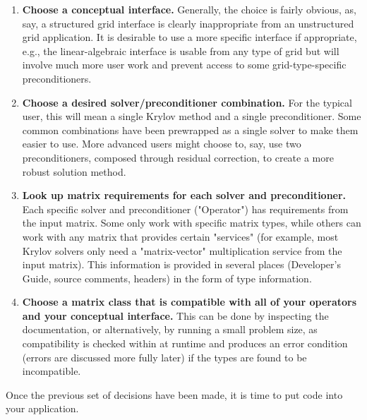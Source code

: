 \begin{enumerate}

\item
{\bf Choose a conceptual interface.} Generally, the choice is fairly obvious, as,
say, a structured grid 
interface is clearly inappropriate from an unstructured grid application. It is
desirable to use a more 
specific interface if appropriate, e.g., the linear-algebraic interface is
usable from any type of grid but 
will involve much more user work and prevent access to some grid-type-specific
preconditioners.

\item 
{\bf Choose a desired solver/preconditioner combination.} For the typical user,
this will mean a single 
Krylov method and a single preconditioner. Some common combinations have been
prewrapped as a 
single solver to make them easier to use. More advanced users might choose to,
say, use two 
preconditioners, composed through residual correction, to create a more robust
solution method.

\item 
{\bf Look up matrix requirements for each solver and preconditioner.} Each
specific solver and 
preconditioner ("Operator") has requirements from the input matrix. Some only
work with specific 
matrix types, while others can work with any matrix that provides certain
"services" (for example, 
most Krylov solvers only need a "matrix-vector" multiplication service from the
input matrix). This 
information is provided in several places (Developer's Guide, source comments,
headers) in the form 
of type information.

\item 
{\bf Choose a matrix class that is compatible with all of your operators and your
conceptual 
interface.} This can be done by inspecting the documentation, or alternatively,
by running a small 
problem size, as compatibility is checked within \hypre{} at runtime and produces
an error condition 
(errors are discussed more fully later) if the types are found to be
incompatible.

\end{enumerate}

Once the previous set of decisions have been made, it is time to put code into
your application.

